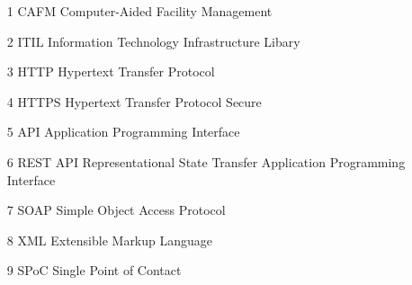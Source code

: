 \documentclass[fontsize=12pt]{scrartcl}
\begin{document}
\vspace*{-1cm}
\setcounter{page}{4}
\tableofcontents 
\newpage

\vspace*{-1cm}
\listoffigures
\newpage

\begin{enumerate}
\item[1] CAFM \tabto{3cm} Computer-Aided Facility Management
\item[2] ITIL \tabto{3cm} Information Technology Infrastructure Libary
\item[3] HTTP \tabto{3cm} Hypertext Transfer Protocol
\item[4] HTTPS \tabto{3cm} Hypertext Transfer Protocol Secure
\item[5] API \tabto{3cm} Application Programming Interface
\item[6] REST API \tabto{3cm} Representational State Transfer Application Programming Interface
\item[7] SOAP \tabto{3cm} Simple Object Access Protocol
\item[8] XML \tabto{3cm} Extensible Markup Language
\item[9] SPoC \tabto{3cm} Single Point of Contact

\end{enumerate}
\newpage

\newpage
\end{document}
